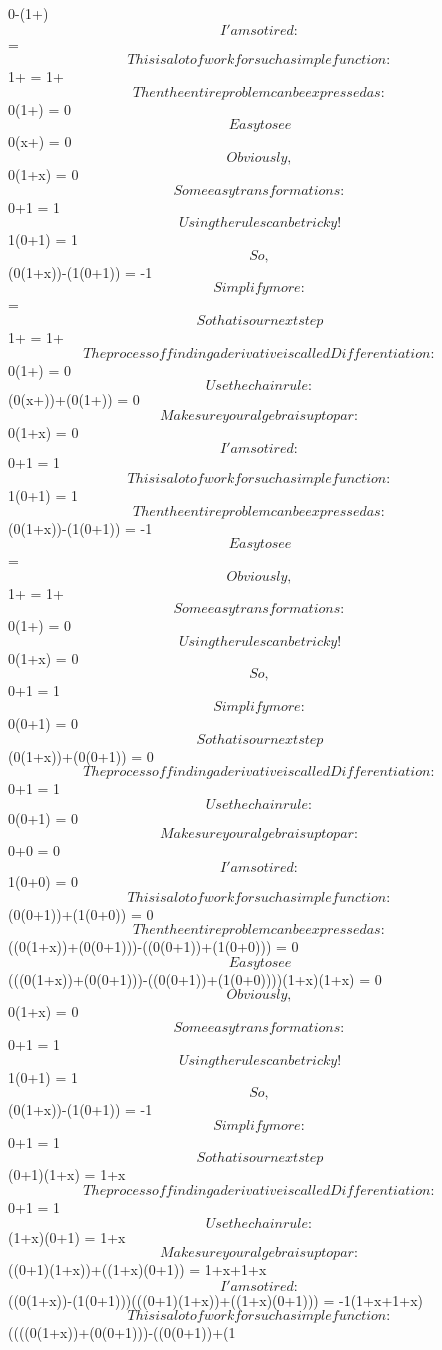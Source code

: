 \documentclass[12pt]{article}
\begin{document}
0-(1+)$$I'am so tired: $$ = $$This is a lot of work for such a simple function: $$1+ = 1+$$Then the entire problem can be expressed as: $$0\cdot (1+) = 0$$Easy to see$$0\cdot (x+) = 0$$Obviously, $$0\cdot (1+x) = 0$$Some easy transformations: $$0+1 = 1$$Using the rules can be tricky!$$1\cdot (0+1) = 1$$So, $$(0\cdot (1+x))-(1\cdot (0+1)) = -1$$Simplify more: $$ = $$So that is our next step$$1+ = 1+$$The process of finding a derivative is called Differentiation: $$0\cdot (1+) = 0$$Use the chain rule: $$(0\cdot (x+))+(0\cdot (1+)) = 0$$Make sure your algebra is up to par: $$0\cdot (1+x) = 0$$I'am so tired: $$0+1 = 1$$This is a lot of work for such a simple function: $$1\cdot (0+1) = 1$$Then the entire problem can be expressed as: $$(0\cdot (1+x))-(1\cdot (0+1)) = -1$$Easy to see$$ = $$Obviously, $$1+ = 1+$$Some easy transformations: $$0\cdot (1+) = 0$$Using the rules can be tricky!$$0\cdot (1+x) = 0$$So, $$0+1 = 1$$Simplify more: $$0\cdot (0+1) = 0$$So that is our next step$$(0\cdot (1+x))+(0\cdot (0+1)) = 0$$The process of finding a derivative is called Differentiation: $$0+1 = 1$$Use the chain rule: $$0\cdot (0+1) = 0$$Make sure your algebra is up to par: $$0+0 = 0$$I'am so tired: $$1\cdot (0+0) = 0$$This is a lot of work for such a simple function: $$(0\cdot (0+1))+(1\cdot (0+0)) = 0$$Then the entire problem can be expressed as: $$((0\cdot (1+x))+(0\cdot (0+1)))-((0\cdot (0+1))+(1\cdot (0+0))) = 0$$Easy to see$$(((0\cdot (1+x))+(0\cdot (0+1)))-((0\cdot (0+1))+(1\cdot (0+0))))\cdot (1+x)\cdot (1+x) = 0$$Obviously, $$0\cdot (1+x) = 0$$Some easy transformations: $$0+1 = 1$$Using the rules can be tricky!$$1\cdot (0+1) = 1$$So, $$(0\cdot (1+x))-(1\cdot (0+1)) = -1$$Simplify more: $$0+1 = 1$$So that is our next step$$(0+1)\cdot (1+x) = 1+x$$The process of finding a derivative is called Differentiation: $$0+1 = 1$$Use the chain rule: $$(1+x)\cdot (0+1) = 1+x$$Make sure your algebra is up to par: $$((0+1)\cdot (1+x))+((1+x)\cdot (0+1)) = 1+x+1+x$$I'am so tired: $$((0\cdot (1+x))-(1\cdot (0+1)))\cdot (((0+1)\cdot (1+x))+((1+x)\cdot (0+1))) = -1\cdot (1+x+1+x)$$This is a lot of work for such a simple function: $$((((0\cdot (1+x))+(0\cdot (0+1)))-((0\cdot (0+1))+(1\cdot 
\end{document}
